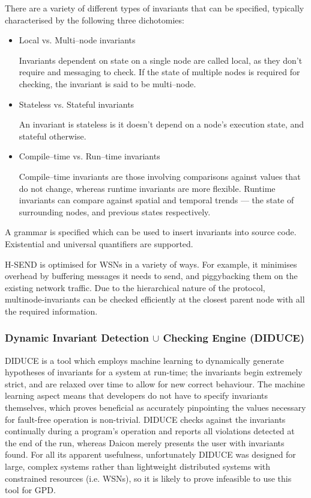There are a variety of different types of invariants that can be specified, typically characterised by the following three dichotomies:

\begin{itemize}
	\item Local vs. Multi--node invariants
	
	Invariants dependent on state on a single node are called local, as they don't require and messaging to check. If the state of multiple nodes is required for checking, the invariant is said to be multi--node.

	\item Stateless vs. Stateful invariants
	
	An invariant is stateless is it doesn't depend on a node's execution state, and stateful otherwise.

	\item Compile--time vs. Run--time invariants

	Compile--time invariants are those involving comparisons against values that do not change, whereas runtime invariants are more flexible. Runtime invariants can compare against spatial and temporal trends ---  the state of surrounding nodes, and previous states respectively.
\end{itemize}

A grammar is specified which can be used to insert invariants into source code. Existential and universal quantifiers are supported.

H-SEND is optimised for WSNs in a variety of ways. For example, it minimises overhead by buffering messages it needs to send, and piggybacking them on the existing network traffic. Due to the hierarchical nature of the protocol, multinode-invariants can be checked efficiently at the closest parent node with all the required information.

\subsubsection*{Dynamic Invariant Detection $\cup$ Checking Engine (DIDUCE)}

DIDUCE \cite{diduce} is a tool which employs machine learning to dynamically generate hypotheses of invariants for a system at run-time; the invariants begin extremely strict, and are relaxed over time to allow for new correct behaviour. The machine learning aspect means that developers do not have to specify invariants themselves, which proves beneficial as accurately pinpointing the values necessary for fault-free operation is non-trivial. DIDUCE checks against the invariants continually during a program's operation and reports all violations detected at the end of the run, whereas Daicon merely presents the user with invariants found. For all its apparent usefulness, unfortunately DIDUCE was designed for large, complex systems rather than lightweight distributed systems with constrained resources (i.e. WSNs), so it is likely to prove infeasible to use this tool for GPD.

